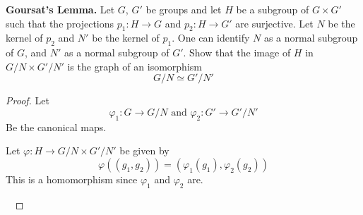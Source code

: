     \begin{exercise}


        \textbf{Goursat's Lemma.} Let $G$, $G'$ be groups and let $H$ be a subgroup of $G\times G'$ such that the projections $p_1\colon H\rightarrow G$ and $p_2\colon H\rightarrow G'$ are surjective. Let $N$ be the kernel of $p_2$ and $N'$ be the kernel of $p_1$. One can identify $N$ as a normal subgroup of $G$, and $N'$ as a normal subgroup of $G'$. Show that the image of $H$ in $G/N\times G'/N'$ is the graph of an isomorphism \[G/N\simeq G'/N'\]
    
    \begin{proof}
        Let \begin{equation*}
            \varphi_1\colon G\rightarrow G/N \text{ and } \varphi_2\colon G'\rightarrow G'/N'
        \end{equation*}
        Be the canonical maps.

        Let $\varphi\colon H\rightarrow G/N\times G'/N'$ be given by \[\varphi((g_1,g_2)) = (\varphi_1(g_1),\varphi_2(g_2)) \]
        This is a homomorphism since $\varphi_1$ and $\varphi_2$ are.

        \

        
    \end{proof}
    \end{exercise}

